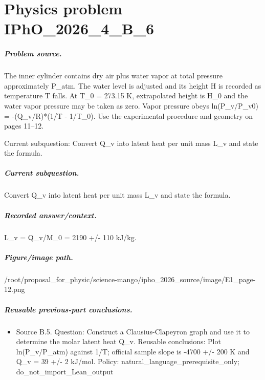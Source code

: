 
\chapter{Physics problem IPhO\_2026\_4\_B\_6}
\label{ch:IPhO2026Problems_problem_IPhO_2026_4_B_6}

\paragraph{Problem source.}
The inner cylinder contains dry air plus water vapor at total pressure
approximately P\_atm.  The water level is adjusted and its height H is recorded
as temperature T falls.  At T\_0 = 273.15 K, extrapolated height is H\_0 and the
water vapor pressure may be taken as zero.  Vapor pressure obeys
ln(P\_v/P\_v0) = -(Q\_v/R)*(1/T - 1/T\_0).  Use the experimental procedure and
geometry on pages 11--12.

Current subquestion:
Convert Q\_v into latent heat per unit mass L\_v and state the formula.

\paragraph{Current subquestion.}
Convert Q\_v into latent heat per unit mass L\_v and state the formula.

\paragraph{Recorded answer/context.}
L\_v = Q\_v/M\_0 = 2190 +/- 110 kJ/kg.

\paragraph{Figure/image path.}
/root/proposal\_for\_physic/science-mango/ipho\_2026\_source/image/E1\_page-12.png

\paragraph{Reusable previous-part conclusions.}
\begin{itemize}
\item Source B.5. Question: Construct a Clausius-Clapeyron graph and use it to determine the molar latent heat Q\_v. Reusable conclusions: Plot ln(P\_v/P\_atm) against 1/T; official sample slope is -4700 +/- 200 K and Q\_v = 39 +/- 2 kJ/mol. Policy: natural\_language\_prerequisite\_only; do\_not\_import\_Lean\_output
\end{itemize}

